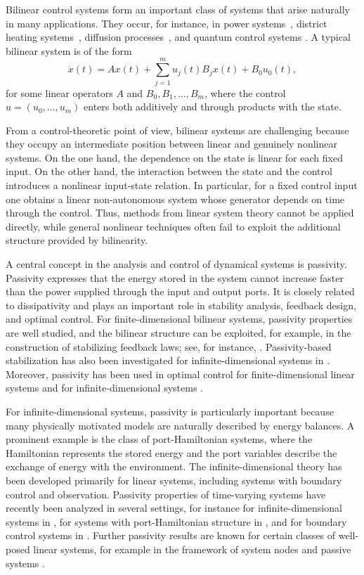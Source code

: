 \documentclass{cocv}
\theoremstyle{definition}
\begin{document}
Bilinear control systems form an important class of systems that arise naturally in many applications. They occur, for instance, in power systems~\cite{GerSZMS25}, district heating systems~\cite{vdHeFRSSBMN17}, diffusion processes~\cite{Breiten18}, and quantum control systems \cite{Beauchard2013}. A typical bilinear system is of the form
\[
    \dot x(t) = A x(t) + \sum_{j=1}^m u_j(t) B_j x(t) + B_0 u_0(t),
\]
for some linear operators $A$ and $B_0,B_1,\ldots,B_m$, where the control $u=(u_0,\ldots,u_m)$ enters both additively and through products with the state.

From a control-theoretic point of view, bilinear systems are challenging because they occupy an intermediate position between linear and genuinely nonlinear systems. On the one hand, the dependence on the state is linear for each fixed input. On the other hand, the interaction between the state and the control introduces a nonlinear input-state relation. In particular, for a fixed control input one obtains a linear non-autonomous system whose generator depends on time through the control. Thus, methods from linear system theory cannot be applied directly, while general nonlinear techniques often fail to exploit the additional structure provided by bilinearity.

A central concept in the analysis and control of dynamical systems is passivity. Passivity expresses that the energy stored in the system cannot increase faster than the power supplied through the input and output ports. It is closely related to dissipativity and plays an important role in stability analysis, feedback design, and optimal control. For finite-dimensional bilinear systems, passivity properties are well studied, and the bilinear structure can be exploited, for example, in the construction of stabilizing feedback laws; see, for instance, \cite{Monafred23}. Passivity-based stabilization has also been investigated for infinite-dimensional systems in \cite{Berrahmoune2010}. Moreover, passivity has been used in optimal control for finite-dimensional linear systems \cite{Schaller21} and for infinite-dimensional systems \cite{hastir2026}.

For infinite-dimensional systems, passivity is particularly important because many physically motivated models are naturally described by energy balances. A prominent example is the class of port-Hamiltonian systems, where the Hamiltonian represents the stored energy and the port variables describe the exchange of energy with the environment. The infinite-dimensional theory has been developed primarily for linear systems, including systems with boundary control and observation. Passivity properties of time-varying systems have recently been analyzed in several settings, for instance for infinite-dimensional systems in \cite{SchnaubeltWeiss10}, for systems with port-Hamiltonian structure in \cite{Kurula24}, and for boundary control systems in \cite{JacoLaas21}. Further passivity results are known for certain classes of well-posed linear systems, for example in the framework of system nodes and passive systems \cite{Staffans2002,Philipp2025}.
\end{document}

